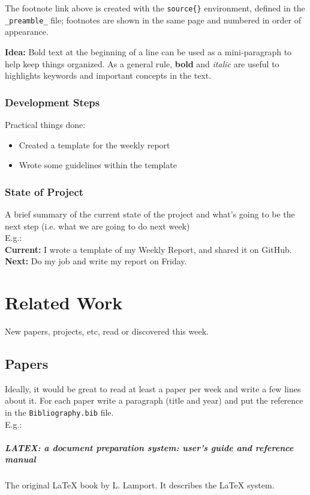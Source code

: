 The footnote link above is created with the \verb|source{}| environment, defined in the \verb|_preamble_| file;
footnotes are shown in the same page and numbered in order of appearance.

\textbf{Idea:} Bold text at the beginning of a line can be used as a mini-paragraph to help keep things organized.
As a general rule, \textbf{bold} and \textit{italic} are useful to highlights keywords and important concepts in the text.
%
\subsection{Development Steps}
Practical things done:
\begin{itemize}
  \item Created a template for the weekly report
  \item Wrote some guidelines within the template
\end{itemize}
%
\subsection{State of Project}
A brief summary of the current state of the project and what's going to be the next step (i.e. what we are going to do next week)\\
E.g.:\\
\textbf{Current:} I wrote a template of my Weekly Report, and shared it on GitHub.\\
\textbf{Next:} Do my job and write my report on Friday.

\chapter{Related Work}
New papers, projects, etc, read or discovered this week.
\section{Papers}
Ideally, it would be great to read at least a paper per week and write a few lines about it. For each paper write a paragraph (title and year) and put the reference in the \verb|Bibliography.bib| file.\\
E.g.:
\paragraph{LATEX: a document preparation system: user's guide and reference manual}\cite{lamport1994latex} The original LaTeX book  by L. Lamport. It describes the LaTeX system.
